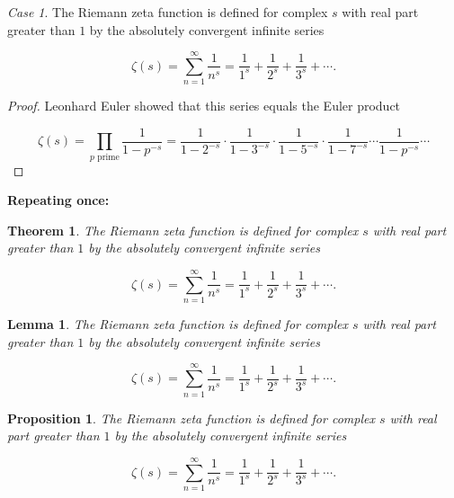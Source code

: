 \documentclass[english,oneside, article]{memoir}
\theoremstyle{plain}
\newtheorem{Theorem}{Theorem}[chapter]
\newtheorem*{Lemma}{Lemma}
\newtheorem*{Proposition}{Proposition}
\theoremstyle{definition}
\theoremstyle{remark}
\newtheorem{Case}{Case}[chapter]
\begin{document}
\begin{Case}

The Riemann zeta function is defined for complex \(s\) with real part
greater than \(1\) by the absolutely convergent infinite series

\[\zeta(s) = \sum_{n=1}^\infty \frac{1}{n^s} = \frac{1}{1^s} + \frac{1}{2^s} + \frac{1}{3^s} + \cdots.\]

\end{Case}

\begin{proof}

Leonhard Euler showed that this series equals the Euler product

\[\zeta(s) = \prod_{p \text{ prime}} \frac{1}{1-p^{-s}}= \frac{1}{1-2^{-s}}\cdot\frac{1}{1-3^{-s}}\cdot\frac{1}{1-5^{-s}}\cdot\frac{1}{1-7^{-s}} \cdots \frac{1}{1-p^{-s}} \cdots\]

\end{proof}

\textbf{Repeating once:}

\begin{Theorem}

The Riemann zeta function is defined for complex \(s\) with real part
greater than \(1\) by the absolutely convergent infinite series

\[\zeta(s) = \sum_{n=1}^\infty \frac{1}{n^s} = \frac{1}{1^s} + \frac{1}{2^s} + \frac{1}{3^s} + \cdots.\]

\end{Theorem}

\begin{Lemma}

The Riemann zeta function is defined for complex \(s\) with real part
greater than \(1\) by the absolutely convergent infinite series

\[\zeta(s) = \sum_{n=1}^\infty \frac{1}{n^s} = \frac{1}{1^s} + \frac{1}{2^s} + \frac{1}{3^s} + \cdots.\]

\end{Lemma}

\begin{Proposition}

The Riemann zeta function is defined for complex \(s\) with real part
greater than \(1\) by the absolutely convergent infinite series

\[\zeta(s) = \sum_{n=1}^\infty \frac{1}{n^s} = \frac{1}{1^s} + \frac{1}{2^s} + \frac{1}{3^s} + \cdots.\]

\end{Proposition}
\end{document}
